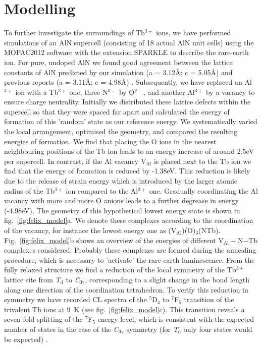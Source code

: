 \documentclass[%
aip,
rsi,%
 amsmath,amssymb,%
 reprint,%
]{revtex4-1}
\begin{document}
\section{Modelling}
\label{sec:model}
To further investigate the surroundings of Tb$^{3+}$ ions, we have performed simulations of an AlN supercell (consisting of 18 actual AlN unit cells) using the MOPAC2012 software \cite{steward12} with the extension SPARKLE \cite{freire10} to describe the rare-earth ion. For pure, undoped AlN we found good agreement between the lattice constants of AlN predicted by our simulation (a = 3.12\AA; c = 5.05\AA) and previous reports (a = 3.11\AA; c = 4.98\AA) \cite{ICDD11}. Subsequently, we have replaced an Al$^{3+}$ ion with a Tb$^{3+}$ one, three N$^{3-}$ by O$^{2-}$, and another Al$^{3+}$ by a vacancy to ensure charge neutrality. Initially we distributed these lattice defects within the supercell so that they were spaced far apart and calculated the energy of formation of this 'random' state as our reference energy. We systematically varied the local arrangement, optimised the geometry, and compared the resulting energies of formation. We find that placing the O ions in the nearest neighbouring positions of the Tb ion leads to an energy increase of around 2.5eV per supercell. In contrast, if the Al vacancy V$_\text{Al}$ is placed next to the Tb ion we find that the energy of formation is reduced by -1.38eV. This reduction is likely due to the release of strain energy which is introduced by the larger atomic radius of the Tb$^{3+}$ ion compared to the Al$^{3+}$ one. Gradually coordinating the Al vacancy with more and more O anions leads to a further degrease in energy (-4.98eV). The geometry of this hypothetical lowest energy state is shown in fig.~\ref{fig:felix_model}a. We denote these complexes according to the coordination of the vacancy, for instance the lowest energy one as (V$_\text{Al}$)(O)$_3$(NTb). Fig.~\ref{fig:felix_model}b shows an overview of the energies of different V$_\text{Al}-$N$-$Tb complexes considered. Probably these complexes are formed during the annealing procedure, which is necessary to 'activate' the rare-earth luminescence. From the fully relaxed structure we find a reduction of the local symmetry of the Tb$^{3+}$ lattice site from \textit{T$_\text{d}$} to \textit{C$_\text{3v}$}, corresponding to a slight change in the bond length along one direction of the coordination tetrahedron. To verify this reduction in symmetry we have recorded CL spectra of the $^5$D$_4$ to $^7$F$_5$ transition of the trivalent Tb ions at 9~K (see fig.~\ref{fig:felix_model}c). This transition reveals a seven-fold splitting of the $^7$F$_5$ energy level, which is consistent with the expected number of states in the case of the \textit{C$_\text{3v}$} symmetry (for \textit{T$_\text{d}$} only four states would be expected) \cite{henderson05}.
\end{document}
